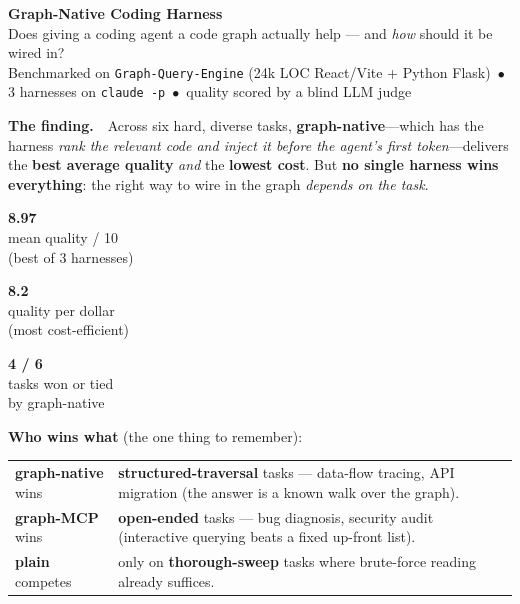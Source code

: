 \documentclass[11pt]{article}
\newcommand{\native}[1]{\textcolor{native}{\textbf{#1}}}
\newcommand{\mcp}[1]{\textcolor{mcp}{\textbf{#1}}}
\newenvironment{keyfind}{%
  \def\FrameCommand{\color{panelln}\vrule width 3pt\hspace{8pt}%
    \fboxsep=8pt\colorbox{panelbg}}%
  \MakeFramed{\hsize\dimexpr\linewidth-11pt\relax\FrameRestore}}{\endMakeFramed}
\newcommand{\herotile}[3]{%
  \begin{minipage}[t]{0.31\linewidth}\centering
  \colorbox{#1!12}{\parbox[t][2.0cm][c]{\linewidth}{\centering
    {\fontsize{30}{32}\selectfont\textcolor{#1}{\textbf{#2}}}\\[2pt]
    {\footnotesize\color{ink} #3}}}\end{minipage}}
\begin{document}
\thispagestyle{empty}

\begin{center}
{\fontsize{22}{24}\selectfont\bfseries\color{ink} Graph-Native Coding Harness}\\[3pt]
{\large\color{ink} Does giving a coding agent a code graph actually help --- and \emph{how} should it be wired in?}\\[6pt]
{\footnotesize\color{plainc} Benchmarked on \texttt{Graph-Query-Engine} (24k LOC React/Vite + Python Flask) \,$\bullet$\,
3 harnesses on \texttt{claude -p} \,$\bullet$\, quality scored by a blind LLM judge}
\end{center}
\vspace{10pt}

\begin{keyfind}
{\large\textbf{The finding.}}\ \ Across six hard, diverse tasks, \native{graph-native}---which has the
harness \emph{rank the relevant code and inject it before the agent's first token}---delivers the
\native{best average quality} \emph{and} the \native{lowest cost}. But \textbf{no single harness wins
everything}: the right way to wire in the graph \emph{depends on the task}.
\end{keyfind}

\vspace{8pt}
\begin{center}
\herotile{native}{8.97}{mean quality / 10\\(best of 3 harnesses)}\hfill
\herotile{native}{8.2}{quality per dollar\\(most cost-efficient)}\hfill
\herotile{ink}{4 / 6}{tasks won or tied\\by graph-native}
\end{center}

\vspace{10pt}
\noindent\textbf{Who wins what} (the one thing to remember):
\begin{center}\small
\begin{tabularx}{\linewidth}{@{}p{3.1cm} >{\raggedright\arraybackslash}X@{}}
\native{graph-native} wins & \textbf{structured-traversal} tasks --- data-flow tracing, API migration (the answer is a known walk over the graph). \\
\mcp{graph-MCP} wins & \textbf{open-ended} tasks --- bug diagnosis, security audit (interactive querying beats a fixed up-front list). \\
\textcolor{plainc}{\textbf{plain}} competes & only on \textbf{thorough-sweep} tasks where brute-force reading already suffices. \\
\end{tabularx}
\end{center}
\end{document}
